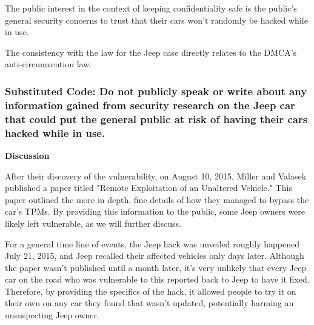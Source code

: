 \documentclass[12pt]{article}
\begin{document}
\begin{multicols}{2}
The public interest in the context of keeping confidentiality safe is the public's general security concerns to trust that their cars won't randomly be hacked while in use. 

The consistency with the law for the Jeep case directly relates to the DMCA's anti-circumvention law.




\subsubsection{Substituted Code: Do not publicly speak or write about any information gained from security research on the Jeep car that could put the general public at risk of having their cars hacked while in use.}


\vspace{.5cm}\textbf{Discussion}\vspace{.25cm}

After their discovery of the vulnerability, on August 10, 2015, Miller and Valasek published a paper titled "Remote Exploitation of an Unaltered Vehicle."\cite{officialPaper} This paper outlined the more in depth, fine details of how they managed to bypass the car's TPMs. By providing this information to the public, some Jeep owners were likely left vulnerable, as we will further discuss.

For a general time line of events, the Jeep hack was unveiled roughly happened July 21, 2015\cite{wired}, and Jeep recalled their affected vehicles only days later.\cite{recall} Although the paper wasn't published until a month later, it's very unlikely that every Jeep car on the road who was vulnerable to this reported back to Jeep to have it fixed. Therefore, by providing the specifics of the hack, it allowed people to try it on their own on any car they found that wasn't updated, potentially harming an unsuspecting Jeep owner. 


\end{multicols}
\end{document}
